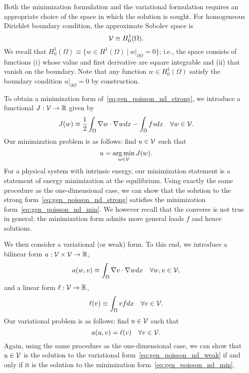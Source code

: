 Both the minimization formulation and the variational formulation requires an appropriate choice of the space in which the solution is sought.  For homogeneous Dirichlet boundary condition, the approximate Sobolev space is
\begin{equation*}
  \mathcal{V} \equiv H^1_0(\Omega).
\end{equation*}
We recall that $H^1_0(\Omega) \equiv \{ w \in H^1(\Omega) \ | \ w|_{\partial \Omega} = 0 \}$; i.e., the space consists of functions (i) whose value and first derivative are square integrable and (ii) that vanish on the boundary.  Note that any function $w \in H^1_0(\Omega)$ satisfy the boundary condition $u|_{\partial \Omega} = 0$ by construction.

To obtain a minimization form of~\eqref{eq:gen_poisson_nd_strong}, we introduce a functional $J: \mathcal{V} \to \mathbb{R}$ given by
\begin{equation*}
  J(w) \equiv \frac{1}{2} \int_\Omega \nabla w \cdot \nabla w dx - \int_\Omega f s dx \quad \forall w \in \mathcal{V}.
\end{equation*}
Our minimization problem is as follows: find $u \in \mathcal{V}$ such that
\begin{equation}
  u = \operatorname*{arg\,min}_{w \in \mathcal{V}} J(w). \label{eq:gen_poisson_nd_min}
\end{equation}
For a physical system with intrinsic energy, our minimization statement is a statement of energy minimization at the equilibrium. Using exactly the same procedure as the one-dimensional case, we can show that the solution to the strong form~\eqref{eq:gen_poisson_nd_strong} satisfies the minimization form~\eqref{eq:gen_poisson_nd_min}.  We however recall that the converse is not true in general; the minimization form admits more general loads $f$ and hence solutions.

We then consider a variational (or weak) form.  To this end, we introduce a bilinear form $a: \mathcal{V} \times \mathcal{V} \to \mathbb{R}$,
\begin{equation*}
  a(w,v) \equiv \int_\Omega \nabla v \cdot \nabla w dx \quad \forall w,v \in \mathcal{V},
\end{equation*}
and a linear form $\ell: \mathcal{V} \to \mathbb{R}$,
\begin{equation*}
  \ell(v) \equiv \int_\Omega v f dx \quad \forall v \in \mathcal{V}.
\end{equation*}
Our variational problem is as follows: find $u \in \mathcal{V}$ such that
\begin{equation}
  a(u,v) = \ell(v) \quad \forall v \in \mathcal{V}. \label{eq:gen_poisson_nd_weak}
\end{equation}
Again, using the same procedure as the one-dimensional case, we can show that $u \in \mathcal{V}$ is the solution to the variational form~\eqref{eq:gen_poisson_nd_weak} if and only if it is the solution to the minimization form~\eqref{eq:gen_poisson_nd_min}.




